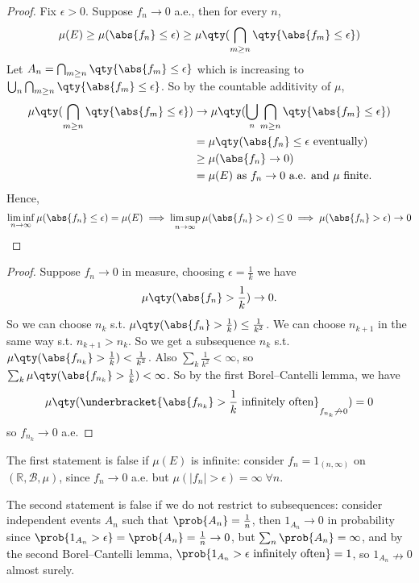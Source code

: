 \begin{proof}
	Fix $\epsilon > 0$.
	Suppose $f_n \to 0$ a.e., then for every $n$,
	\begin{align*}
		\mu(E) \geq \mu(\abs{f_n} \leq \epsilon) \geq \mu\qty(\bigcap_{m \geq n} \qty{\abs{f_m} \leq \epsilon})
	\end{align*}
	Let $A_n = \bigcap_{m \geq n} \qty{\abs{f_m} \leq \epsilon}$ which is increasing to $\bigcup_n \bigcap_{m \geq n} \qty{\abs{f_m} \leq \epsilon}$.
	So by the countable additivity of $\mu$,
	\begin{align*}
		\mu\qty(\bigcap_{m \geq n} \qty{\abs{f_m} \leq \epsilon}) &\to \mu\qty(\bigcup_n \bigcap_{m \geq n} \qty{\abs{f_m} \leq \epsilon}) \\
		&= \mu\qty(\abs{f_n} \leq \epsilon \text{ eventually}) \\
		&\geq \mu(\abs{f_n} \to 0) \\
		&= \mu(E) \text{ as $f_n \to 0$ a.e. and $\mu$ finite.}
	\end{align*}
	Hence,
	\begin{align*}
		\liminf_{n \to \infty} \mu(\abs{f_n} \leq \epsilon) = \mu(E) \implies \limsup_{n \to \infty} \mu(\abs{f_n} > \epsilon) \leq 0 \implies \mu(\abs{f_n} > \epsilon) \to 0
	\end{align*}
\end{proof}

\begin{proof}
	Suppose $f_n \to 0$ in measure, choosing $\epsilon = \frac{1}{k}$ we have
	\begin{align*}
		\mu\qty(\abs{f_n} > \frac{1}{k}) \to 0.
	\end{align*}
	So we can choose $n_k$ s.t. $\mu\qty(\abs{f_n} > \frac{1}{k}) \leq \frac{1}{k^2}$.
	We can choose $n_{k+1}$ in the same way s.t. $n_{k+1} > n_k$.
	So we get a subsequence $n_k$ s.t. $\mu\qty(\abs{f_{n_k}} > \frac{1}{k}) < \frac{1}{k^2}$.
	Also $\sum_k \frac{1}{k^2} < \infty$, so $\sum_k \mu\qty(\abs{f_{n_k}} > \frac{1}{k}) < \infty$.
	So by the first Borel--Cantelli lemma, we have
	\begin{align*}
		\mu\qty(\underbracket{\abs{f_{n_k}} > \frac{1}{k} \text{ infinitely often}}_{f_{n_k} \not\to 0}) = 0
	\end{align*}
	so $f_{n_k} \to 0$ a.e.
\end{proof}

\begin{remark}
	The first statement is false if $\mu(E)$ is infinite: consider $f_n = 1_{(n,\infty)}$ on $(\mathbb R,\mathcal B,\mu)$, since $f_n \to 0$ a.e. but $\mu(|f_n| > \epsilon) = \infty \; \forall n$.

	The second statement is false if we do not restrict to subsequences: consider independent events $A_n$ such that $\prob{A_n} = \frac{1}{n}$, then $1_{A_n} \to 0$ in probability since $\prob{1_{A_n} > \epsilon} = \prob{A_n} = \frac{1}{n} \to 0$, but $\sum_n \prob{A_n} = \infty$, and by the second Borel--Cantelli lemma, $\prob{1_{A_n} > \epsilon \text{ infinitely often}} = 1$, so $1_{A_n} \nrightarrow 0$ almost surely.
\end{remark}

